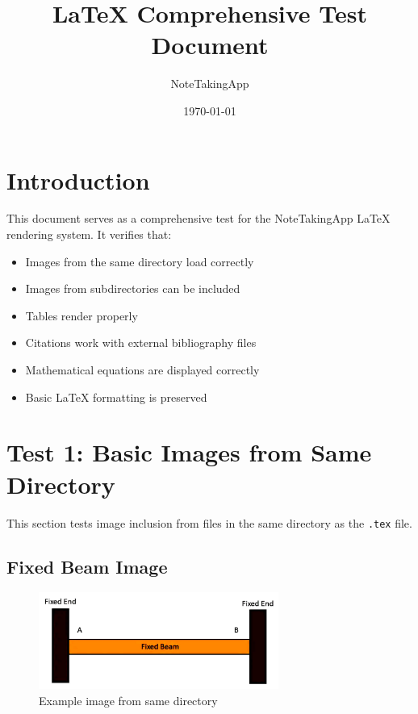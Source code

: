 \documentclass[12pt]{article}
\title{LaTeX Comprehensive Test Document}
\author{NoteTakingApp}
\date{\today}
\begin{document}
\maketitle

\tableofcontents
\newpage

\section{Introduction}

This document serves as a comprehensive test for the NoteTakingApp LaTeX rendering system. It verifies that:

\begin{itemize}
    \item Images from the same directory load correctly
    \item Images from subdirectories can be included
    \item Tables render properly
    \item Citations work with external bibliography files
    \item Mathematical equations are displayed correctly
    \item Basic LaTeX formatting is preserved
\end{itemize}

\section{Test 1: Basic Images from Same Directory}

This section tests image inclusion from files in the same directory as the \texttt{.tex} file.

\subsection{Fixed Beam Image}

\begin{figure}[ht]
    \centering
    \includegraphics[width=0.7\textwidth]{Fixed Beam.png}
    \caption{Example image from same directory}
    \label{fig:fixed-beam}
\end{figure}
\end{document}
